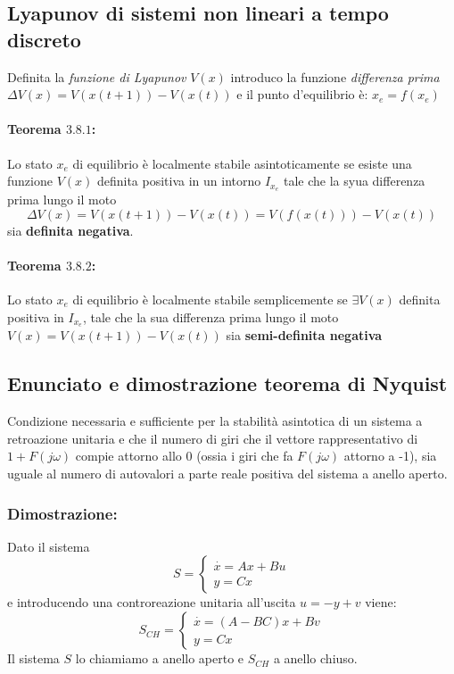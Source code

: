 \documentclass{article}
\begin{document}
\subsection{Lyapunov di sistemi non lineari a tempo discreto}
Definita la \textit{funzione di Lyapunov} $V(x)$ introduco la  funzione 
\textit{differenza prima} $\Delta V(x) = V(x(t+1))-V(x(t))$ e il punto d'equilibrio è:
$x_e = f(x_e)$
\paragraph{Teorema $3.8.1$:} Lo stato $x_e$ di equilibrio è localmente stabile asintoticamente se esiste una
funzione $V(x)$ definita positiva in un intorno $I_{x_e}$ tale che la syua differenza prima lungo il moto 
\[ \Delta V(x) = V(x(t+1))-V(x(t)) = V(f(x(t)))-V(x(t)) \] sia \textbf{definita negativa}.

\paragraph{Teorema $3.8.2$:}Lo stato $x_e$ di equilibrio è localmente stabile semplicemente se $\exists V(x)$ definita
positiva in $I_{x_e}$, tale che la sua differenza prima lungo il moto  $V(x) = V(x(t+1))-V(x(t))$ sia 
\textbf{semi-definita negativa}



\subsection{Enunciato e dimostrazione teorema di Nyquist}
Condizione necessaria e sufficiente per la stabilità asintotica di un sistema a retroazione unitaria e che il numero di 
giri che il vettore rappresentativo di $1+F(j\omega)$ compie attorno allo 0 (ossia i giri che fa $F(j\omega)$ attorno a -1),
sia uguale al numero di autovalori a parte reale positiva del sistema a anello aperto.

\subsubsection{Dimostrazione:}
Dato il sistema 
\[S = \begin{cases} \overset{\cdot}{x} = Ax+Bu\\ y = Cx \end{cases}\]
e introducendo una controreazione unitaria all'uscita $u = -y +v$ viene:
\[S_{CH} = \begin{cases} \overset{\cdot}{x} = (A-BC)x+Bv\\ y = Cx \end{cases}\]
Il sistema $S$ lo chiamiamo a anello aperto e $S_{CH}$ a anello chiuso.
\end{document}
